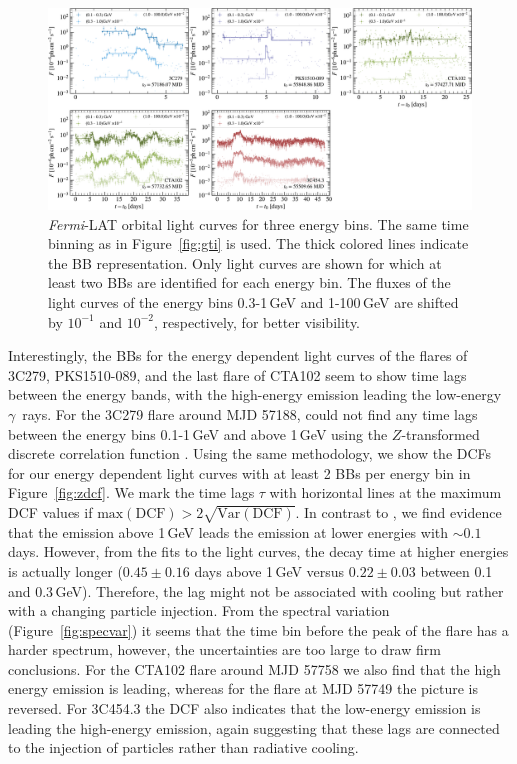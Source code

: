 \documentclass[twocolumn,linenumbers]{aastex62}
\newcommand{\Grays}{$\gamma$~rays\xspace}
\newcommand{\fermiLAT}{\emph{Fermi}-LAT\xspace}
\begin{document}
\begin{figure}
    \centering
    \includegraphics[width = .9 \linewidth]{lc_ebins_ts9.pdf}
    \caption{\fermiLAT orbital light curves for three energy bins. The same time binning as in Figure~\ref{fig:gti} is used. The thick colored lines indicate the BB representation. Only light curves are shown for which at least two BBs are identified for each energy bin. The fluxes of the light curves of the energy bins 0.3-1\,GeV and 1-100\,GeV are shifted by $10^{-1}$ and $10^{-2}$, respectively, for better visibility. }
    \label{fig:lcebins}
\end{figure}

Interestingly, the BBs for the energy dependent light curves of the flares of 3C279, PKS1510-089, and the last flare of CTA102 seem to show time lags between the energy bands, with the high-energy emission leading the low-energy \Grays.
For the 3C279 flare around MJD 57188, \citet{2015ApJ...808L..48P} could not find any time lags between the energy bins 0.1-1\,GeV and above 1\,GeV using the $Z$-transformed discrete correlation function \citep[DCF;][]{1997ASSL..218..163A,2013arXiv1302.1508A}.
Using the same methodology, we show the DCFs for our energy dependent light curves with at least 2 BBs per energy bin in Figure~\ref{fig:zdcf}.
We mark the time lags $\tau$ with horizontal lines at the maximum DCF values if $\mathrm{max}(\mathrm{DCF}) > 2 \sqrt{\mathrm{Var}(\mathrm{DCF})}$.
In contrast to \citet{2015ApJ...808L..48P}, we find evidence that the emission above 1\,GeV leads the emission at lower energies with $\sim 0.1$ days. 
However, from the fits to the light curves, the decay time at higher energies is actually longer ($0.45\pm0.16$ days above 1\,GeV versus $0.22 \pm 0.03$ between 0.1 and 0.3\,GeV). 
Therefore, the lag might not be associated with cooling but rather with a changing particle injection. 
From the spectral variation (Figure~\ref{fig:specvar}) it seems that the time bin before the peak of the flare has a harder spectrum, however, the uncertainties are too large to draw firm conclusions.
For the CTA102 flare around MJD 57758 we also find that the high energy emission is leading, whereas for the flare at MJD 57749 the picture is reversed. 
For 3C454.3 the DCF also indicates that the low-energy emission is leading the high-energy emission, again suggesting that these lags are connected to the injection of particles rather than radiative cooling.
\end{document}
